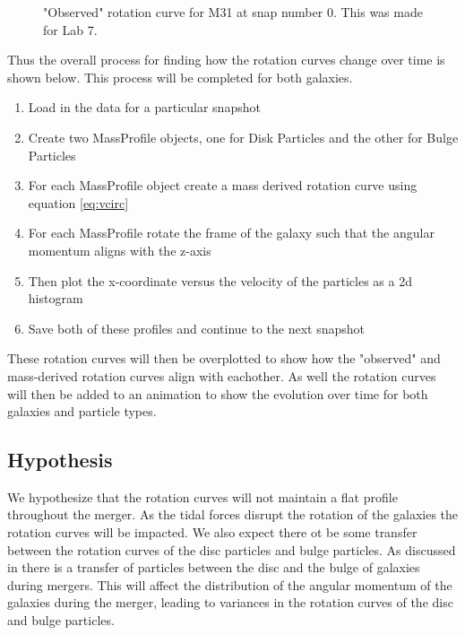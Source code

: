 \documentclass[twocolumn,linenumbers,trackchanges]{aastex7}
\begin{document}
\begin{figure}[ht!]
	\caption{"Observed" rotation curve for M31 at snap number 0. This was made for Lab 7.}
	\label{fig:Lab7}
\end{figure}

Thus the overall process for finding how the rotation curves change over time is shown below.
This process will be completed for both galaxies.
\begin{enumerate}
	\item Load in the data for a particular snapshot
	\item Create two MassProfile objects, one for Disk Particles and the other for Bulge Particles
	\item For each MassProfile object create a mass derived rotation curve using equation \ref{eq:vcirc}
	\item For each MassProfile rotate the frame of the galaxy such that the angular momentum aligns with the z-axis
	\item Then plot the x-coordinate versus the velocity of the particles as a 2d histogram
	\item Save both of these profiles and continue to the next snapshot
\end{enumerate}

These rotation curves will then be overplotted to show how the "observed" and mass-derived rotation curves align with eachother.
As well the rotation curves will then be added to an animation to show the evolution over time for both galaxies and particle types.

\subsection{Hypothesis}
We hypothesize that the rotation curves will not maintain a flat profile throughout the merger.
As the tidal forces disrupt the rotation of the galaxies the rotation curves will be impacted.
We also expect there ot be some transfer between the rotation curves of the disc particles and bulge particles.
As discussed in \cite{Kannan2015} there is a transfer of particles between the disc and the bulge of galaxies during mergers.
This will affect the distribution of the angular momentum of the galaxies during the merger, leading to variances in the rotation curves of the disc and bulge particles.

\end{document}
